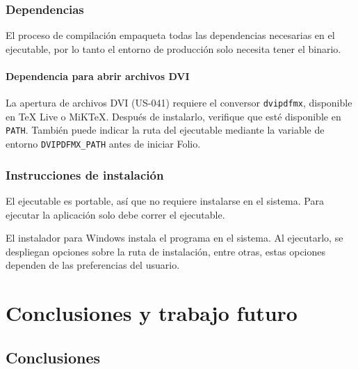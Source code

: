 \subsection{Dependencias}
El proceso de compilación empaqueta todas las dependencias necesarias en el ejecutable, por lo tanto el entorno de producción solo necesita tener el binario.

\subsubsection{Dependencia para abrir archivos DVI}
La apertura de archivos DVI (US-041) requiere el conversor \texttt{dvipdfmx}, disponible en TeX Live o MiKTeX. Después de instalarlo, verifique que esté disponible en \texttt{PATH}. También puede indicar la ruta del ejecutable mediante la variable de entorno \texttt{DVIPDFMX\_PATH} antes de iniciar Folio.

\subsection{Instrucciones de instalación}
El ejecutable es portable, así que no requiere instalarse en el sistema. Para ejecutar la aplicación solo debe correr el ejecutable.

El instalador para Windows instala el programa en el sistema. Al ejecutarlo, se despliegan opciones sobre la ruta de instalación, entre otras, estas opciones dependen de las preferencias del usuario.


%
%
%


\chapter{Conclusiones y trabajo futuro}
\section{Conclusiones}

